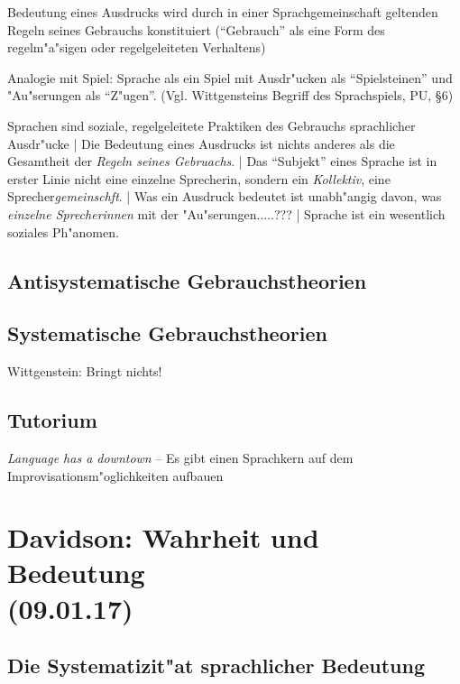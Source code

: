 \documentclass[emulatestandardclasses]{scrartcl}
\begin{document}
\begin{description}[leftmargin=!,labelwidth=\widthof{\bfseries Erl"auterung}]
    \item[Grundidee] Bedeutung eines Ausdrucks wird durch in einer Sprachgemeinschaft geltenden Regeln seines Gebrauchs konstituiert ("`Gebrauch"' als eine Form des regelm"a"sigen oder regelgeleiteten Verhaltens)
    \item[Erl"auterung] Analogie mit Spiel: Sprache als ein Spiel mit Ausdr"ucken als "`Spielsteinen"' und "Au"serungen als "`Z"ugen"'. (Vgl. Wittgensteins Begriff des Sprachspiels, PU, \S 6)
    \item[Folgerungen]Sprachen sind soziale, regelgeleitete Praktiken des Gebrauchs sprachlicher Ausdr"ucke | Die Bedeutung eines Ausdrucks ist nichts anderes als die Gesamtheit der \emph{Regeln seines Gebruachs}. | Das "`Subjekt"' eines Sprache ist in erster Linie nicht eine einzelne Sprecherin, sondern ein \emph{Kollektiv}, eine Sprecher\emph{gemeinschft}. | Was ein Ausdruck bedeutet ist unabh"angig davon, was \emph{einzelne Sprecherinnen} mit der "Au"serungen.....??? | Sprache ist ein wesentlich soziales Ph"anomen.
\end{description}

\subsection{Antisystematische Gebrauchstheorien}


\subsection{Systematische Gebrauchstheorien}

Wittgenstein: Bringt nichts!

\subsection{Tutorium}

\emph{Language has a downtown} -- Es gibt einen Sprachkern auf dem Improvisationsm"oglichkeiten aufbauen


\section{Davidson: Wahrheit und Bedeutung\\(09.01.17)}

\subsection{Die Systematizit"at sprachlicher Bedeutung}
\end{document}
